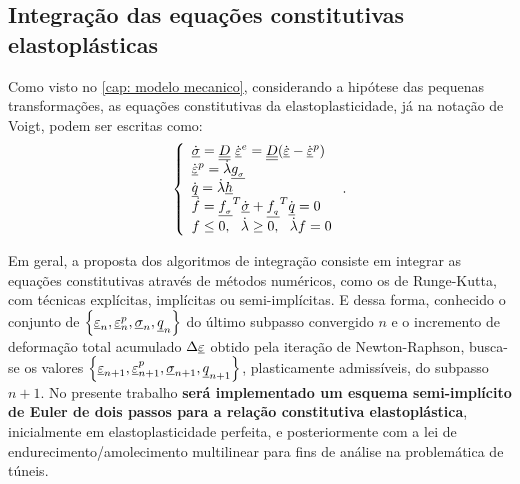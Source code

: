 \subsection{Integração das equações constitutivas elastoplásticas}

Como visto no \autoref{cap: modelo mecanico}, considerando a hipótese das pequenas transformações, as equações constitutivas da elastoplasticidade, já na notação de Voigt, podem ser escritas como:
\begin{equation}
	\label{eq:constitutiva_ep}
	\left\{
	\begin{array}{lcl}
		\dot {\underline \sigma} = \underline{\underline D}~\dot {\underline{\varepsilon}}^e = \underline{\underline D}(\dot {\underline{\varepsilon}} - \dot {\underline{\varepsilon}}^p) \\
		\dot {\underline{\varepsilon}}^p = \dot \lambda \underline{g_{_\sigma}} \\
		\dot {\underline q} = \dot \lambda \underline h \\
		\dot f = \underline{f_{_\sigma}}^T \dot {\underline \sigma} + \underline{f_{_q}}^T \dot {\underline q} = 0 \\
		f \leq 0,~~\dot \lambda \geq 0,~~\dot \lambda f = 0	
	\end{array}
	\right..
\end{equation}

Em geral, a proposta dos algoritmos de integração consiste em integrar as equações constitutivas através de métodos numéricos, como os de Runge-Kutta, com técnicas explícitas, implícitas ou semi-implícitas. E dessa forma, conhecido o conjunto de $\left\{ \underline{\varepsilon}_n, \underline{\varepsilon}_n^p,\underline \sigma_n,\underline q_n \right\}$ do último subpasso convergido $n$ e o incremento de deformação total acumulado $\Delta \underline{\varepsilon}$ obtido pela iteração de Newton-Raphson, busca-se os valores $\left\{ \underline{\varepsilon}_{n+1}, \underline{\varepsilon}_{n+1}^p,\underline \sigma_{n+1},\underline q_{n+1} \right\}$, plasticamente admissíveis, do subpasso $n+1$. No presente trabalho \textbf{será implementado um esquema semi-implícito de Euler de dois passos para a relação constitutiva elastoplástica}, inicialmente em elastoplasticidade perfeita, e posteriormente com a lei de endurecimento/amolecimento multilinear para fins de análise na problemática de túneis.

